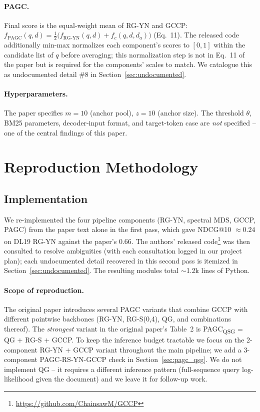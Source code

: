 \documentclass[sigconf]{acmart}
\begin{document}
\paragraph{PAGC.} Final score is the equal-weight mean of RG-YN and
GCCP:
$f_{\text{PAGC}}(q,d) = \tfrac{1}{2}\bigl(f_{\text{RG-YN}}(q,d) + f_c(q,d,d_a)\bigr)$
(Eq.~11). The released code additionally min-max normalizes each
component's scores to $[0,1]$ within the candidate list of $q$
before averaging; this normalization step is not in Eq.~11 of the
paper but is required for the components' scales to match. We
catalogue this as undocumented detail \#8 in
Section~\ref{sec:undocumented}.

\paragraph{Hyperparameters.} The paper specifies
$m=10$ (anchor pool), $z=10$ (anchor size). The threshold $\theta$,
BM25 parameters, decoder-input format, and target-token case are
\emph{not} specified -- one of the central findings of this paper.

\section{Reproduction Methodology}

\subsection{Implementation}
We re-implemented the four pipeline components (RG-YN, spectral MDS,
GCCP, PAGC) from the paper text alone in the first pass, which gave
NDCG@10 $\approx 0.24$ on DL19 RG-YN against the paper's $0.66$. The
authors' released code\footnote{\url{https://github.com/ChainsawM/GCCP}}
was then consulted to resolve ambiguities (with each consultation
logged in our project plan); each undocumented detail recovered in
this second pass is itemized in Section~\ref{sec:undocumented}. The
resulting modules total $\sim$1.2k lines of Python.

\paragraph{Scope of reproduction.} The original paper introduces
several PAGC variants that combine GCCP with different pointwise
backbones (RG-YN, RG-S(0,4), QG, and combinations thereof). The
\emph{strongest} variant in the original paper's Table~2 is
PAGC\textsubscript{QSG} = QG $+$ RG-S $+$ GCCP. To keep the
inference budget tractable we focus on the 2-component
RG-YN $+$ GCCP variant throughout the main pipeline; we add a
3-component PAGC-RS-YN-GCCP check in
Section~\ref{sec:pagc_qsg}. We do not implement QG -- it requires a
different inference pattern (full-sequence query log-likelihood
given the document) and we leave it for follow-up work.
\end{document}
